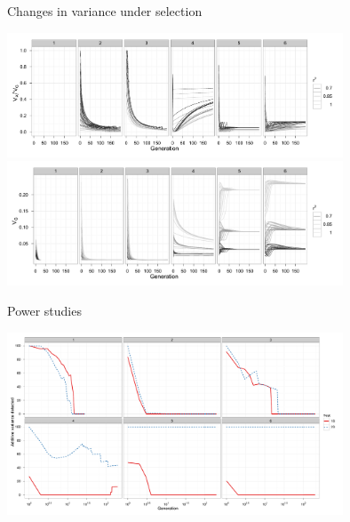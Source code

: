 \documentclass{beamer}
\begin{document}
\begin{frame}{Changes in variance under selection}
\begin{center}
\includegraphics[width=10cm]{propadditive_det_grey.pdf} \\
\includegraphics[width=10cm]{Vg_det_grey.pdf}
\end{center}
\end{frame}

\begin{frame}{Power studies}
\begin{center}
\includegraphics[width=10cm]{powersimple.pdf} \\
\end{center}
\end{frame}
\end{document}
